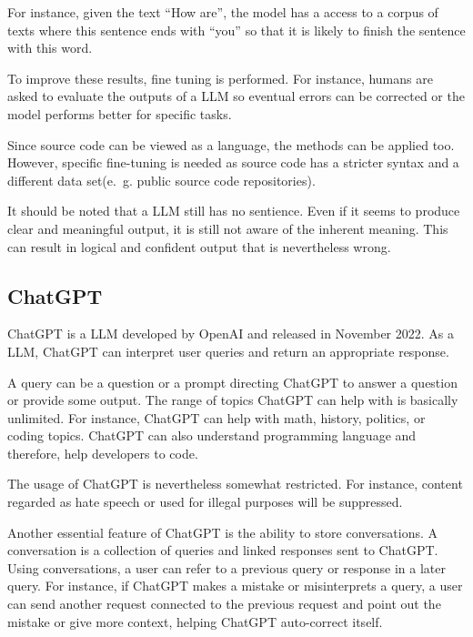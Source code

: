 For instance, given the text \enquote{How are}, the model  has a access to a corpus of texts where this sentence ends with \enquote{you} so that it is likely to finish the sentence with this word. 

To improve these results, fine tuning is performed. For instance, humans are asked to evaluate the outputs of a \ac{LLM} so eventual errors can be corrected or the model performs better for specific tasks.



Since source code can be viewed as a language, the methods can be applied too. However, specific fine-tuning is needed as source code  has a stricter syntax and a different data set(e.~g. public source code repositories).

It should be noted that a \ac{LLM} still has no sentience. Even if it seems to produce clear and meaningful output, it is still not aware of the inherent meaning. This can result in logical and confident output that is nevertheless wrong. \cite{Amaratunga2023}


\subsection{ChatGPT}
\label{sec:chatgpt}


ChatGPT \cite{ChatGPT_url} is a \ac{LLM} developed by OpenAI and released in November 2022. As a \ac{LLM}, ChatGPT can interpret user queries and return an appropriate response. 

A query can be a question or a prompt directing ChatGPT to answer a question or provide some output. The range of topics ChatGPT can help with is basically unlimited. For instance, ChatGPT can help with math, history, politics, or coding topics. ChatGPT can also understand programming language and therefore, help developers to code.  

The usage of ChatGPT is nevertheless somewhat restricted. For instance, content regarded as hate speech or used for illegal purposes will be suppressed.

Another essential feature of ChatGPT is the ability to store conversations. A conversation is a collection of queries and linked responses sent to ChatGPT. Using conversations, a user can refer to a previous query or response in a later query. For instance, if ChatGPT makes a mistake or misinterprets a query, a user can send another request connected to the previous request and point out the mistake or give more context, helping ChatGPT auto-correct itself. 

